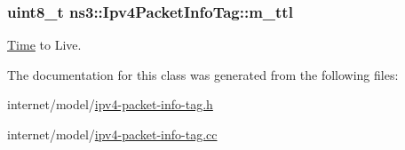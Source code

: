 \subsubsection[{\texorpdfstring{m\+\_\+ttl}{m_ttl}}]{\setlength{\rightskip}{0pt plus 5cm}uint8\+\_\+t ns3\+::\+Ipv4\+Packet\+Info\+Tag\+::m\+\_\+ttl\hspace{0.3cm}{\ttfamily [private]}}\hypertarget{classns3_1_1Ipv4PacketInfoTag_a2b80a48dd23f7d029a4e9472d1a40fc8}{}\label{classns3_1_1Ipv4PacketInfoTag_a2b80a48dd23f7d029a4e9472d1a40fc8}


\hyperlink{classns3_1_1Time}{Time} to Live. 



The documentation for this class was generated from the following files\+:\begin{DoxyCompactItemize}
\item 
internet/model/\hyperlink{ipv4-packet-info-tag_8h}{ipv4-\/packet-\/info-\/tag.\+h}\item 
internet/model/\hyperlink{ipv4-packet-info-tag_8cc}{ipv4-\/packet-\/info-\/tag.\+cc}\end{DoxyCompactItemize}
